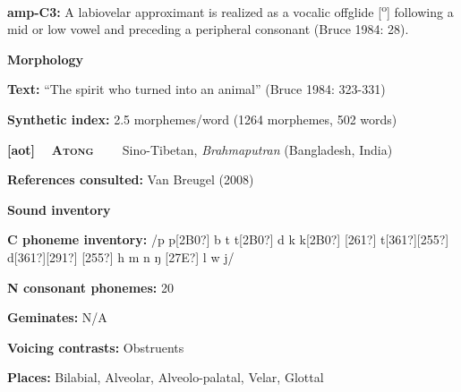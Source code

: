 \begin{styleBody}
\textbf{amp-C3:} A labiovelar approximant is realized as a vocalic offglide [\textsuperscript{o}] following a mid or low vowel and preceding a peripheral consonant (Bruce 1984: 28).
\end{styleBody}

\begin{styleBody}
\textbf{Morphology}
\end{styleBody}

\begin{styleBody}
\textbf{Text: }“The spirit who turned into an animal” (Bruce 1984: 323-331)
\end{styleBody}

\begin{styleBody}
\textbf{Synthetic index: }2.5 morphemes/word (1264 morphemes, 502 words)
\end{styleBody}

\clearpage\begin{styleBody}
\textbf{[aot] }\ \ \textbf{\textsc{Atong\ \ }}\textbf{\ \ }Sino-Tibetan, \textit{Brahmaputran} (Bangladesh, India)
\end{styleBody}

\begin{styleBody}
\textbf{References consulted: }Van Breugel (2008)
\end{styleBody}

\begin{styleBody}
\textbf{Sound inventory}
\end{styleBody}

\begin{styleBody}
\textbf{C phoneme inventory:} /p p[2B0?] b t t[2B0?] d k k[2B0?] [261?] t[361?][255?] d[361?][291?] [255?] h m n ŋ [27E?] l w j/
\end{styleBody}

\begin{styleBody}
\textbf{N consonant phonemes:} 20
\end{styleBody}

\begin{styleBody}
\textbf{Geminates:} N/A
\end{styleBody}

\begin{styleBody}
\textbf{Voicing contrasts: }Obstruents
\end{styleBody}

\begin{styleBody}
\textbf{Places: }Bilabial, Alveolar, Alveolo-palatal, Velar, Glottal
\end{styleBody}

